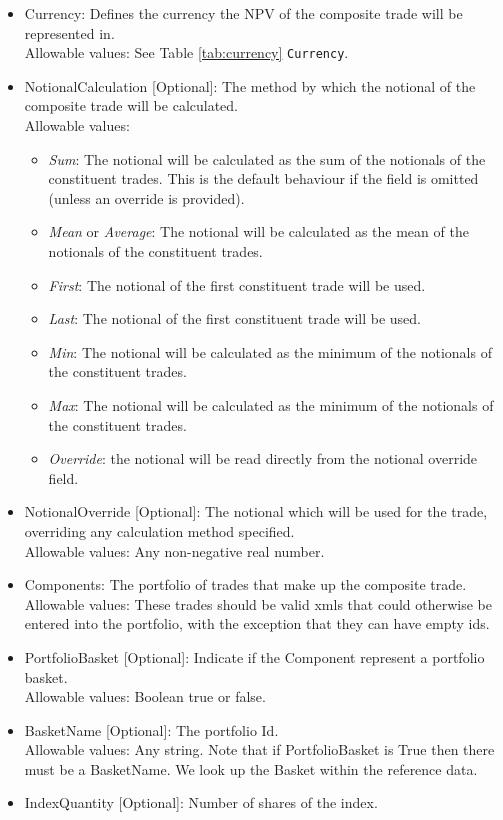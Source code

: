 \begin{itemize}
	\item Currency: Defines the currency the NPV of the composite trade will be represented in. \\
	  Allowable values:  See Table \ref{tab:currency} \lstinline!Currency!.
	\item NotionalCalculation [Optional]: The method by which the notional of the composite trade will be calculated. \\
	  Allowable values:
	  \begin{itemize}
	  	\item[] \emph{Sum}: The notional will be calculated as the sum of the notionals of the constituent trades. This is the default behaviour if the field is omitted (unless an override is provided).
	  	\item[] \emph{Mean} or \emph{Average}: The notional will be calculated as the mean of the notionals of the constituent trades.
	  	\item[] \emph{First}: The notional of the first constituent trade will be used.
	  	\item[] \emph{Last}: The notional of the first constituent trade will be used.
	  	\item[] \emph{Min}: The notional will be calculated as the minimum of the notionals of the constituent trades.
	  	\item[] \emph{Max}: The notional will be calculated as the minimum of the notionals of the constituent trades.
	  	\item[] \emph{Override}: the notional will be read directly from the notional override field.
	  \end{itemize}
	\item NotionalOverride [Optional]: The notional which will be used for the trade, overriding any calculation method specified. \\
      Allowable values: Any non-negative real number.
	\item Components: The portfolio of trades that make up the composite trade. \\
      Allowable values: These trades should be valid xmls that could otherwise be entered into the portfolio, with the exception that they can have empty ids.
    \item PortfolioBasket [Optional]: Indicate if the Component represent a portfolio basket. \\
    Allowable values: Boolean true or false.
    \item BasketName [Optional]: The portfolio Id. \\
    Allowable values: Any string. Note that if PortfolioBasket is True then there must be a BasketName. We look up the Basket within the reference data.
    \item IndexQuantity [Optional]: Number of shares of the index.
\end{itemize}
